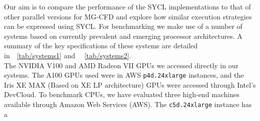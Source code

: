 \documentclass[runningheads]{llncs}
\begin{document}
Our aim is to compare the performance of the SYCL implementations to that of 
other parallel versions for MG-CFD and explore how similar execution strategies 
can be expressed using SYCL. For benchmarking we make use of a number of 
systems based on currently prevalent and emerging processor architectures. A 
summary of the key specifications of these systems are detailed 
in~\tablename{~\ref{tab/systems1}} and ~\tablename{~\ref{tab/systems2}}. \\
\indent The NVIDIA V100 and AMD Radeon VII GPUs we accessed directly in our 
systems. The A100 GPUs used were in AWS \texttt{p4d.24xlarge} instances, and the 
Iris XE MAX (Based on XE LP architecture) GPUs were accessed through Intel's 
DevCloud. To benchmark CPUs, we have evaluated three high-end machines available 
through Amazon Web Services (AWS). The \texttt{c5d.24xlarge} instance has a 
\end{document}
